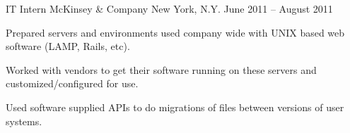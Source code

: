 \begin{cventries}
	\cventry
		{IT Intern} %
		{McKinsey \& Company} %
		{New York, N.Y.} %
		{June 2011 – August 2011} %
		{
			\begin{cvitems} %
				\item {Prepared servers and environments used company wide with UNIX based web software (LAMP, Rails, etc).}
				\item {Worked with vendors to get their software running on these servers and customized/configured for use.}
				\item {Used software supplied APIs to do migrations of files between versions of user systems.}
			\end{cvitems}
		}

\end{cventries}
